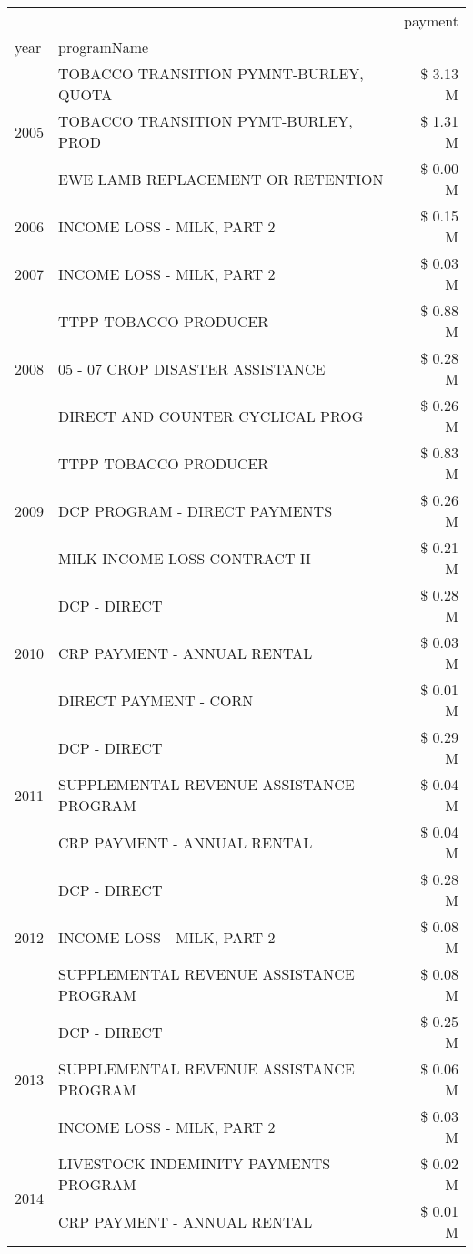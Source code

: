 \begin{tabular}{llr}
\toprule
 &  & payment \\
year & programName &  \\
\midrule
\multirow[t]{3}{*}{2005} & TOBACCO TRANSITION PYMNT-BURLEY, QUOTA & \$ 3.13 M \\
 & TOBACCO TRANSITION PYMT-BURLEY, PROD & \$ 1.31 M \\
 & EWE LAMB REPLACEMENT OR RETENTION & \$ 0.00 M \\
\cline{1-3}
2006 & INCOME LOSS - MILK, PART 2 & \$ 0.15 M \\
\cline{1-3}
2007 & INCOME LOSS - MILK, PART 2 & \$ 0.03 M \\
\cline{1-3}
\multirow[t]{3}{*}{2008} & TTPP TOBACCO PRODUCER & \$ 0.88 M \\
 & 05 - 07 CROP DISASTER ASSISTANCE & \$ 0.28 M \\
 & DIRECT AND COUNTER CYCLICAL PROG & \$ 0.26 M \\
\cline{1-3}
\multirow[t]{3}{*}{2009} & TTPP TOBACCO PRODUCER & \$ 0.83 M \\
 & DCP PROGRAM - DIRECT PAYMENTS & \$ 0.26 M \\
 & MILK INCOME LOSS CONTRACT II & \$ 0.21 M \\
\cline{1-3}
\multirow[t]{3}{*}{2010} & DCP - DIRECT & \$ 0.28 M \\
 & CRP PAYMENT - ANNUAL RENTAL & \$ 0.03 M \\
 & DIRECT PAYMENT - CORN & \$ 0.01 M \\
\cline{1-3}
\multirow[t]{3}{*}{2011} & DCP - DIRECT & \$ 0.29 M \\
 & SUPPLEMENTAL REVENUE ASSISTANCE PROGRAM & \$ 0.04 M \\
 & CRP PAYMENT - ANNUAL RENTAL & \$ 0.04 M \\
\cline{1-3}
\multirow[t]{3}{*}{2012} & DCP - DIRECT & \$ 0.28 M \\
 & INCOME LOSS - MILK, PART 2 & \$ 0.08 M \\
 & SUPPLEMENTAL REVENUE ASSISTANCE PROGRAM & \$ 0.08 M \\
\cline{1-3}
\multirow[t]{3}{*}{2013} & DCP - DIRECT & \$ 0.25 M \\
 & SUPPLEMENTAL REVENUE ASSISTANCE PROGRAM & \$ 0.06 M \\
 & INCOME LOSS - MILK, PART 2 & \$ 0.03 M \\
\cline{1-3}
\multirow[t]{3}{*}{2014} & LIVESTOCK INDEMINITY PAYMENTS PROGRAM & \$ 0.02 M \\
 & CRP PAYMENT - ANNUAL RENTAL & \$ 0.01 M \\

\end{tabular}
